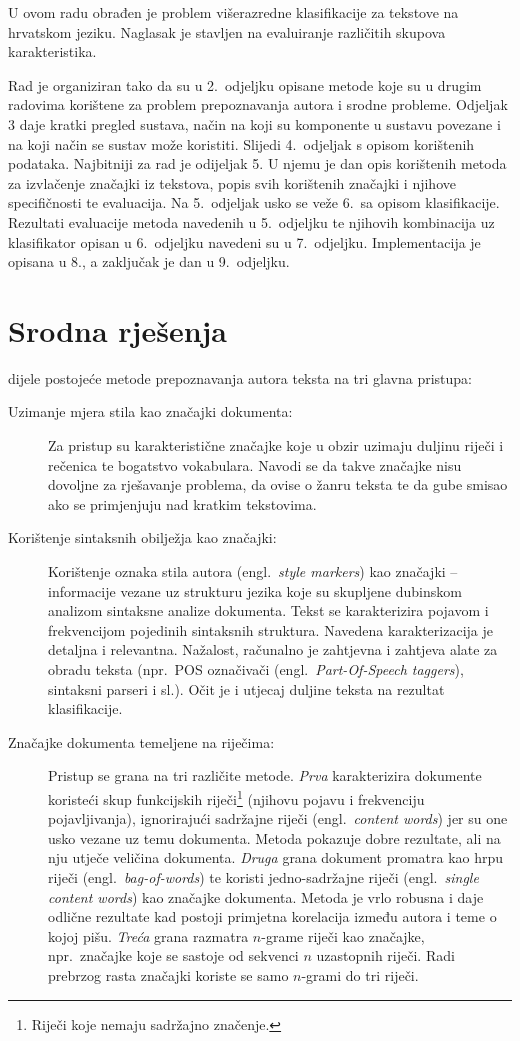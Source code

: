 \documentclass{article}
\newcommand{\engl}[1]{(engl.~\emph{#1})}
\begin{document}
U ovom radu obrađen je problem višerazredne klasifikacije za tekstove na
hrvatskom jeziku. Naglasak je stavljen na evaluiranje različitih skupova
karakteristika.

Rad je organiziran tako da su u 2.~odjeljku opisane metode koje su u drugim
radovima korištene za problem prepoznavanja autora i srodne probleme. Odjeljak 3
daje kratki pregled sustava, način na koji su komponente u sustavu povezane i na
koji način se sustav može koristiti. Slijedi 4.~odjeljak s opisom korištenih
podataka. Najbitniji za rad je odijeljak 5. U njemu je dan opis korištenih metoda
za izvlačenje značajki iz tekstova, popis svih korištenih značajki i njihove
specifičnosti te evaluacija. Na 5.~odjeljak usko se veže 6.~sa opisom
klasifikacije. Rezultati evaluacije metoda navedenih u 5.~odjeljku te njihovih
kombinacija uz klasifikator opisan u 6.~odjeljku navedeni su u 7.~odjeljku.
Implementacija je opisana u 8., a zaključak je dan u 9.~odjeljku.

\newpage

\section{Srodna rješenja}
\citet{coyotl2006authorship} dijele postojeće metode prepoznavanja autora
teksta na tri glavna pristupa:
\begin{description}
\item[Uzimanje mjera stila kao značajki dokumenta:] Za pristup su
karakteristične značajke koje u obzir uzimaju duljinu riječi i rečenica te
bogatstvo vokabulara. Navodi se da takve značajke nisu dovoljne za rješavanje
problema, da ovise o žanru teksta te da gube smisao ako se primjenjuju nad
kratkim tekstovima.
\item[Korištenje sintaksnih obilježja kao značajki:] Korištenje oznaka stila
autora \engl{style markers} kao značajki -- informacije vezane uz strukturu
jezika koje su skupljene dubinskom analizom sintaksne analize dokumenta. Tekst se
karakterizira pojavom i frekvencijom pojedinih sintaksnih struktura. Navedena
karakterizacija je detaljna i relevantna. Nažalost, računalno je zahtjevna i
zahtjeva alate za obradu teksta (npr.~POS označivači \engl{Part-Of-Speech taggers},
sintaksni parseri i sl.). Očit je i utjecaj duljine teksta na rezultat klasifikacije.
\item[Značajke dokumenta temeljene na riječima:] Pristup se grana na tri
različite metode. \emph{Prva} karakterizira dokumente koristeći skup funkcijskih
riječi\footnote{Riječi koje nemaju sadržajno značenje.} (njihovu pojavu i
frekvenciju pojavljivanja), ignorirajući sadržajne riječi \engl{content words}
jer su one usko vezane uz temu dokumenta. Metoda pokazuje dobre rezultate, ali na
nju utječe veličina dokumenta. \emph{Druga} grana dokument promatra kao hrpu
riječi \engl{bag-of-words} te koristi jedno-sadržajne riječi \engl{single
content words} kao značajke dokumenta. Metoda je vrlo robusna i daje odlične rezultate
kad postoji primjetna korelacija između autora i teme o kojoj pišu. \emph{Treća}
grana razmatra $n$-grame riječi kao značajke, npr.~značajke koje se sastoje od
sekvenci $n$ uzastopnih riječi. Radi prebrzog rasta značajki koriste se samo
$n$-grami do tri riječi.
\end{description}
\end{document}
